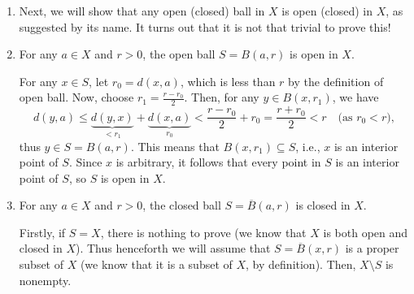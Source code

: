 \begin{enumerate}
\item Next, we will show that any open (closed) ball in \(X\) is open (closed)
in \(X\), as suggested by its name. It turns out that it is not that trivial to
prove this!

\item \label{it:open-ball-open}
For any \(a\in X\) and \(r>0\), the open ball \(S=B(a,r)\) is open in
\(X\).

\begin{pf}
For any \(x\in S\), let \(r_0=d(x,a)\), which is less than \(r\) by the
definition of open ball. Now, choose \(\displaystyle r_1=\frac{r-r_0}{2}\).
Then, for any \(y\in B(x,r_1)\), we have
\[
d(y,a)\le \underbrace{d(y, x)}_{<r_1}+\underbrace{d(x, a)}_{r_0}
<\frac{r-r_0}{2}+r_0
=\frac{r+r_0}{2}<r\quad\text{(as \(r_0<r\))},
\]
thus \(y\in S=B(a,r)\). This means that \(B(x,r_1)\subseteq S\), i.e., \(x\) is
an interior point of \(S\). Since \(x\) is arbitrary, it follows that every
point in \(S\) is an interior point of \(S\), so \(S\) is open in \(X\).
\end{pf}
\begin{center}
\end{center}

\item \label{it:closed-ball-closed}
For any \(a\in X\) and \(r>0\), the closed ball \(S=\overline{B}(a,r)\)
is closed in \(X\).

\begin{pf}
Firstly, if \(S=X\), there is nothing to prove (we know that \(X\) is both open
and closed in \(X\)). Thus henceforth we will assume that
\(S=\overline{B}(x,r)\) is a proper subset of \(X\) (we know that it is a
subset of \(X\), by definition). Then, \(X\setminus S\) is nonempty.


\end{pf}
\end{enumerate}
